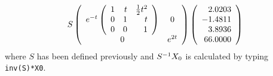 \documentclass{ximera}
\begin{document}
\begin{computerExercise}
\begin{solution}
\begin{eqnarray*}
S\left(\begin{array}{cc} e^{-t}\left(\begin{array}{rrr}
     1  &  t   &   \frac{1}{2}t^2\\
    0   &  1   &   t\\
    0   &  0   &   1 \end{array}\right) & 0\\ 0 &e^{2t}\end{array}\right)
\left(\begin{array}{r} 2.0203\\ -1.4811 \\ 3.8936\\ 66.0000 \end{array}\right)
\end{eqnarray*}
where $S$ has been defined previously and $S^{-1} X_0$ is calculated by typing 
{\tt inv(S)*X0}.


\end{solution}
\end{computerExercise}
\end{document}

